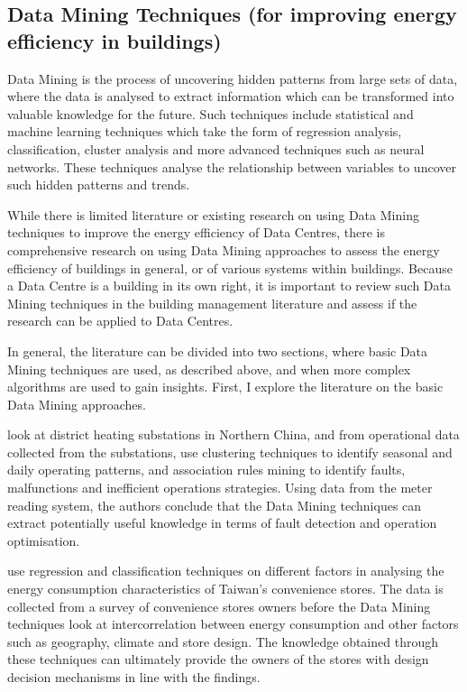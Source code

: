 \documentclass[12pt]{scrartcl}
\begin{document}
\subsection{Data Mining Techniques (for improving energy efficiency in buildings)}  
\label{subsec:[Data Mining Techniques]}
Data Mining is the process of uncovering hidden patterns from large sets of data, where the data is analysed to extract information which can be transformed into valuable knowledge for the future. Such techniques include statistical and machine learning techniques which take the form of regression analysis, classification, cluster analysis and more advanced techniques such as neural networks. These techniques analyse the relationship between variables to uncover such hidden patterns and trends.  

While there is limited literature or existing research on using Data Mining techniques to improve the energy efficiency of Data Centres, there is comprehensive research on using Data Mining approaches to assess the energy efficiency of buildings in general, or of various systems within buildings. Because a Data Centre is a building in its own right, it is important to review such Data Mining techniques in the building management literature and assess if the research can be applied to Data Centres.   

In general, the literature can be divided into two sections, where basic Data Mining techniques are used, as described above, and when more complex algorithms are used to gain insights. First, I explore the literature on the basic Data Mining approaches.
 
\citet{XUE2017926} look at district heating substations in Northern China, and from operational data collected from the substations, use clustering techniques to identify seasonal and daily operating patterns, and association rules mining to identify faults, malfunctions and inefficient operations strategies. Using data from the meter reading system, the authors conclude that the Data Mining techniques can extract potentially useful knowledge in terms of fault detection and operation optimisation. 

\citet{JEFFREYKUO2018120} use regression and classification techniques on different factors in analysing the energy consumption characteristics of Taiwan's convenience stores. The data is collected from a survey of convenience stores owners before the Data Mining techniques look at intercorrelation between energy consumption and other factors such as geography, climate and store design. The knowledge obtained through these techniques can ultimately provide the owners of the stores with design decision mechanisms in line with the findings.  
\end{document}
